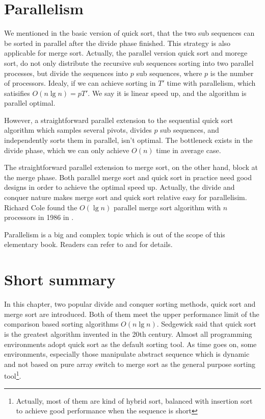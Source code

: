 \documentclass[b5paper]{article}
\begin{document}
\begin{Exercise}
\end{Exercise}

\section{Parallelism}
 
We mentioned in the basic version of quick sort, that the two sub sequences can be sorted in
parallel after the divide phase finished. This strategy is also applicable for merge sort.
Actually, the parallel version quick sort and morege sort, do not only distribute
the recursive sub sequences sorting into two parallel processes, but divide the sequences into
$p$ sub sequences, where $p$ is the number of processors. Idealy, if we can achieve
sorting in $T'$ time with parallelism, which satisifies $O(n \lg n) = p T'$. We say it
is linear speed up, and the algorithm is parallel optimal.

However, a straightforward parallel extension to the sequential quick sort algorithm
which samples several pivots, divides $p$ sub sequences, and independently
sorts them in parallel, isn't optimal. The bottleneck exists in the
divide phase, which we can only achieve $O(n)$ time in average case.

The straightforward parallel extension to merge sort, on the other hand, block
at the merge phase. Both parallel merge sort and quick sort in practice need
good designs in order to achieve the optimal speed up. Actually, the divide and
conquer nature makes merge sort and quick sort relative easy for parallelisim.
Richard Cole found the $O(\lg n)$ parallel merge sort algorithm with $n$ processors
in 1986 in \cite{para-msort}.

Parallelism is a big and complex
topic which is out of the scope of this elementary book. Readers can refer to
\cite{para-msort} and \cite{para-qsort} for details.

\section{Short summary}
In this chapter, two popular divide and conquer sorting methods, quick sort and merge sort are introduced.
Both of them meet the upper performance limit of the comparison based sorting algorithms $O(n \lg n)$.
Sedgewick said that quick sort is the greatest algorithm invented in the 20th century. Almost
all programming environments adopt quick sort as the default sorting tool. As time goes on,
some environments, especially those manipulate abstract sequence which is dynamic and not based on
pure array switch to merge sort as the general purpose sorting tool\footnote{Actually, most of
them are kind of hybrid sort, balanced with insertion sort to achieve good performance when the
sequence is short}.
\end{document}
